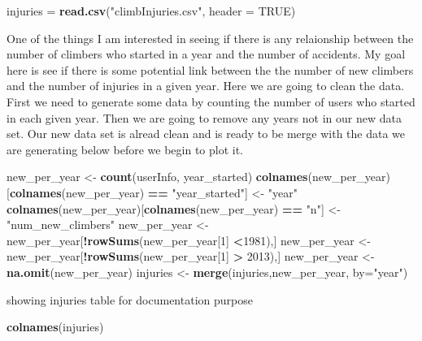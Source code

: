 \documentclass[]{article}
\newenvironment{Shaded}{\begin{snugshade}}{\end{snugshade}}
\newcommand{\DataTypeTok}[1]{\textcolor[rgb]{0.13,0.29,0.53}{#1}}
\newcommand{\DecValTok}[1]{\textcolor[rgb]{0.00,0.00,0.81}{#1}}
\newcommand{\KeywordTok}[1]{\textcolor[rgb]{0.13,0.29,0.53}{\textbf{#1}}}
\newcommand{\NormalTok}[1]{#1}
\newcommand{\OperatorTok}[1]{\textcolor[rgb]{0.81,0.36,0.00}{\textbf{#1}}}
\newcommand{\OtherTok}[1]{\textcolor[rgb]{0.56,0.35,0.01}{#1}}
\newcommand{\StringTok}[1]{\textcolor[rgb]{0.31,0.60,0.02}{#1}}
\begin{document}
\begin{Shaded}
\begin{Highlighting}[]
\NormalTok{injuries =}\StringTok{ }\KeywordTok{read.csv}\NormalTok{(}\StringTok{"climbInjuries.csv"}\NormalTok{, }\DataTypeTok{header =} \OtherTok{TRUE}\NormalTok{)}
\end{Highlighting}
\end{Shaded}

One of the things I am interested in seeing if there is any relaionship
between the number of climbers who started in a year and the number of
accidents. My goal here is see if there is some potential link between
the the number of new climbers and the number of injuries in a given
year. Here we are going to clean the data. First we need to generate
some data by counting the number of users who started in each given
year. Then we are going to remove any years not in our new data set. Our
new data set is alread clean and is ready to be merge with the data we
are generating below before we begin to plot it.

\begin{Shaded}
\begin{Highlighting}[]
\NormalTok{new_per_year <-}\StringTok{ }\KeywordTok{count}\NormalTok{(userInfo, year_started)}
\KeywordTok{colnames}\NormalTok{(new_per_year)[}\KeywordTok{colnames}\NormalTok{(new_per_year) }\OperatorTok{==}\StringTok{ "year_started"}\NormalTok{] <-}\StringTok{ "year"}
\KeywordTok{colnames}\NormalTok{(new_per_year)[}\KeywordTok{colnames}\NormalTok{(new_per_year) }\OperatorTok{==}\StringTok{ "n"}\NormalTok{] <-}\StringTok{ "num_new_climbers"}
\NormalTok{new_per_year <-}\StringTok{ }\NormalTok{new_per_year[}\OperatorTok{!}\KeywordTok{rowSums}\NormalTok{(new_per_year[}\DecValTok{1}\NormalTok{] }\OperatorTok{<}\DecValTok{1981}\NormalTok{),]}
\NormalTok{new_per_year <-}\StringTok{ }\NormalTok{new_per_year[}\OperatorTok{!}\KeywordTok{rowSums}\NormalTok{(new_per_year[}\DecValTok{1}\NormalTok{] }\OperatorTok{>}\StringTok{ }\DecValTok{2013}\NormalTok{),]}
\NormalTok{new_per_year <-}\StringTok{ }\KeywordTok{na.omit}\NormalTok{(new_per_year)}
\NormalTok{injuries <-}\StringTok{ }\KeywordTok{merge}\NormalTok{(injuries,new_per_year, }\DataTypeTok{by=}\StringTok{"year"}\NormalTok{)}
\end{Highlighting}
\end{Shaded}

showing injuries table for documentation purpose

\begin{Shaded}
\begin{Highlighting}[]
\KeywordTok{colnames}\NormalTok{(injuries)}
\end{Highlighting}
\end{Shaded}
\end{document}
